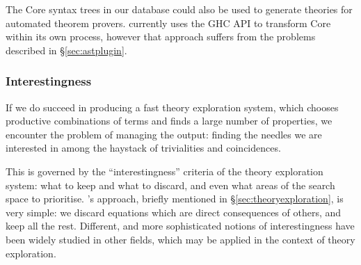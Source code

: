The Core syntax trees in our database could also be used to generate theories for automated theorem provers. \hspec{} currently uses the GHC API to transform Core within its own process, however that approach suffers from the problems described in \S \ref{sec:astplugin}.

\subsubsection{Interestingness}
\label{sec:interestingness}

If we do succeed in producing a fast theory exploration system, which chooses productive combinations of terms and finds a large number of properties, we encounter the problem of managing the output: finding the needles we are interested in among the haystack of trivialities and coincidences.

This is governed by the ``interestingness'' criteria of the theory exploration system: what to keep and what to discard, and even what areas of the search space to prioritise. \qspec{}'s approach, briefly mentioned in \S \ref{sec:theoryexploration}, is very simple: we discard equations which are direct consequences of others, and keep all the rest. Different, and more sophisticated notions of interestingness have been widely studied in other fields, which may be applied in the context of theory exploration.
